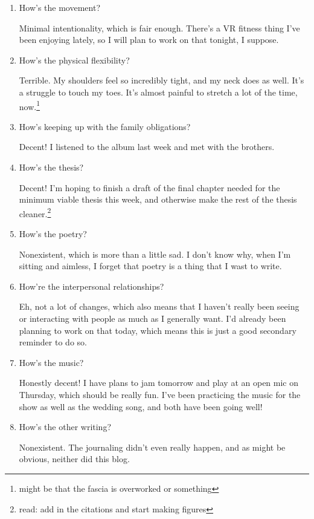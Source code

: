 \documentclass[12pt]{article}
\renewcommand{\,}{\textsuperscript{,}}
\begin{document}
\begin{enumerate}
\item How's the movement?

Minimal intentionality, which is fair enough.  
There's a VR fitness thing I've been enjoying lately, so I will plan to work on that tonight, I suppose.

\item How's the physical flexibility?

Terrible. My shoulders feel so incredibly tight, and my neck does as well.  
It's a struggle to touch my toes.  
It's almost painful to stretch a lot of the time, now.\footnote{might be that the fascia is overworked or something}

\item How's keeping up with the family obligations?

Decent! I listened to the album last week and met with the brothers.

\item How's the thesis?

Decent! I'm hoping to finish a draft of the final chapter needed for the minimum viable thesis this week, and otherwise make the rest of the thesis cleaner.\footnote{read: add in the citations and start making figures}

\item How's the poetry?

Nonexistent, which is more than a little sad. I don't know why, when I'm sitting and aimless, I forget that poetry is a thing that I wast to write.

\item How're the interpersonal relationships?

Eh, not a lot of changes, which also means that I haven't really been seeing or interacting with people as much as I generally want.  
I'd already been planning to work on that today, which means this is just a good secondary reminder to do so.

\item How's the music?

Honestly decent! I have plans to jam tomorrow and play at an open mic on Thursday, which should be really fun.  
I've been practicing the music for the show as well as the wedding song, and both have been going well!

\item How's the other writing?

Nonexistent. The journaling didn't even really happen, and as might be obvious, neither did this blog.


\end{enumerate}
\end{document}
